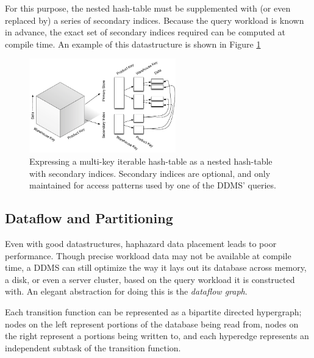 For this purpose, the nested hash-table must be supplemented with (or even replaced by) a series of secondary indices.  Because the query workload is known in advance, the exact set of secondary indices required can be computed at compile time.  An example of this datastructure is shown in Figure \ref{fig:diag:nestedHash}

\begin{figure}
\begin{center}
\includegraphics[width=2.5in]{graphics/MultikeyMap}
\end{center}
\caption{Expressing a multi-key iterable hash-table as a nested hash-table with secondary indices.  Secondary indices are optional, and only maintained for access patterns used by one of the DDMS' queries.}
\label{fig:diag:nestedHash}
\end{figure}


\subsection{Dataflow and Partitioning}
Even with good datastructures, haphazard data placement leads to poor performance.  Though precise workload data may not be available at compile time, a DDMS can still optimize the way it lays out its database across memory, a disk, or even a server cluster, based on the query workload it is constructed with.  An elegant abstraction for doing this is the \textit{dataflow graph}.

Each transition function can be represented as a bipartite directed hypergraph; nodes on the left represent portions of the database being read from, nodes on the right represent a portions being written to, and each hyperedge represents an independent subtask of the transition function.

